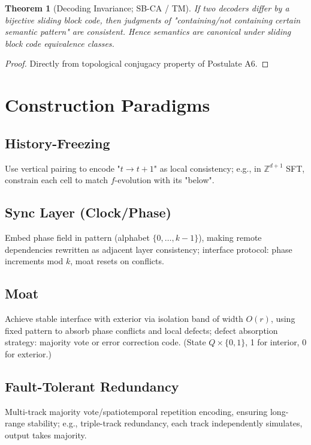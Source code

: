 \documentclass[12pt]{article}
\theoremstyle{plain}
\newtheorem{theorem}{Theorem}[section]
\theoremstyle{definition}
\begin{document}
\begin{theorem}[Decoding Invariance; SB-CA / TM]
If two decoders differ by a bijective sliding block code, then judgments of "containing/not containing certain semantic pattern" are consistent. Hence semantics are canonical under sliding block code equivalence classes.
\end{theorem}

\begin{proof}
Directly from topological conjugacy property of Postulate A6.
\end{proof}

\section{Construction Paradigms}

\subsection{History-Freezing}

Use vertical pairing to encode "$t \to t+1$" as local consistency; e.g., in $\mathbb{Z}^{d+1}$ SFT, constrain each cell to match $f$-evolution with its "below".

\subsection{Sync Layer (Clock/Phase)}

Embed phase field in pattern (alphabet $\{0,\dots,k-1\}$), making remote dependencies rewritten as adjacent layer consistency; interface protocol: phase increments mod $k$, moat resets on conflicts.

\subsection{Moat}

Achieve stable interface with exterior via isolation band of width $O(r)$, using fixed pattern to absorb phase conflicts and local defects; defect absorption strategy: majority vote or error correction code. (State $Q \times \{0,1\}$, 1 for interior, 0 for exterior.)

\subsection{Fault-Tolerant Redundancy}

Multi-track majority vote/spatiotemporal repetition encoding, ensuring long-range stability; e.g., triple-track redundancy, each track independently simulates, output takes majority.
\end{document}
